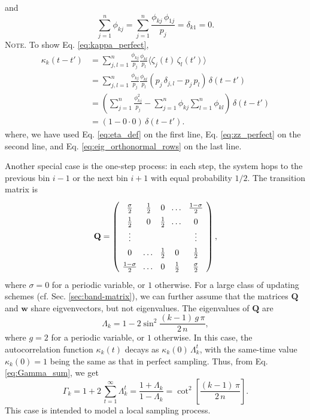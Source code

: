 \documentclass[reprint, floatfix]{revtex4-1}
\newcommand{\note}[1]{{\color{DarkGreen}\footnotesize \textsc{Note.} #1}}
\begin{document}
and
$$
  \sum_{j = 1}^n \phi_{kj}
  =
  \sum_{j = 1}^n \frac{ \phi_{kj} \, \phi_{1j} } { p_j }
  =
  \delta_{k1}
  =
  0.
$$
%
\note{To show Eq. \eqref{eq:kappa_perfect},
  $$
  \begin{aligned}
  \kappa_k(t - t')
  &=
  \sum_{j,l = 1}^n
  \frac{ \phi_{kj} } { p_j }
  \frac{ \phi_{kl} } { p_l }
  \langle \zeta_j(t) \, \zeta_l(t') \rangle
  \\
  &=
  \sum_{j,l = 1}^n
  \frac{ \phi_{kj} } { p_j }
  \frac{ \phi_{kl} } { p_l }
  \left(
    p_j \, \delta_{j, l} - p_j \, p_l
  \right)
  \, \delta(t - t')
  \\
  &=
  \left(
    \sum_{j = 1}^n
    \frac{ \phi_{kj}^2 } { p_j }
    -
    \sum_{j = 1}^n \phi_{kj}
    \sum_{l = 1}^n \phi_{kl}
  \right)
  \, \delta(t - t')
  \\
  &=
  (1 - 0 \cdot 0) \, \delta(t - t').
  \end{aligned}
  $$
  where,
  we have used
  Eq. \eqref{eq:eta_def}
  on the first line,
  Eq. \eqref{eq:zz_perfect}
  on the second line,
  and
  Eq. \eqref{eq:eig_orthonormal_rows}
  on the last line.
}


Another special case is the one-step process\cite{vankampen}:
in each step, the system hops to the previous bin $i - 1$
or the next bin $i + 1$ with equal probability $1/2$.
%
The transition matrix is
%
\begin{equation}
\arraycolsep=3.6pt\def\arraystretch{1.4}
\mathbf Q
=
\left(
  \begin{array}{cccccccc}
    \frac \sigma 2 & \frac 1 2 & 0 & \dots & \frac {1 - \sigma} 2 \\
    \frac 1 2 & 0         & \frac 1 2 & \dots & 0 \\
    \vdots & &  & & \vdots \\
    0 & \dots & \frac 1 2 & 0  & \frac 1 2 \\
    \frac {1 - \sigma} 2 & \dots & 0 & \frac 1 2 & \frac \sigma 2
  \end{array}
\right),
\label{eq:T_nn}
\end{equation}
%
where $\sigma = 0$ for a periodic variable, or $1$ otherwise.
%
For a large class of updating schemes
(cf. Sec. \ref{sec:band-matrix}),
we can further assume that
the matrices $\mathbf Q$ and $\mathbf w$
share eigvenvectors, but not eigenvalues.
%
The eigenvalues of $\mathbf Q$ are
$$
\Lambda_k
=
1 -
2 \sin^2 \frac{ (k - 1) \, g \, \pi }
              {       2 \, n        }
,
$$
where
$g = 2$ for a periodic variable, or $1$ otherwise.
%
In this case,
the autocorrelation function $\kappa_k(t)$
decays as $\kappa_k(0) \, \Lambda_k^t$,
with the same-time value
$\kappa_k(0) = 1$
being the same as
that in perfect sampling.
%
Thus,
from Eq. \eqref{eq:Gamma_sum}, we get
%
\begin{equation}
\Gamma_k
=
1 + 2 \, \sum_{t = 1}^\infty \Lambda_k^t
=
\frac{ 1 + \Lambda_k } { 1 - \Lambda_k }
=
\cot^2 \left[ \frac{ (k - 1) \, \pi } { 2 \, n } \right].
\label{eq:Gamma_onestep}
\end{equation}
%
This case is intended to model a local sampling process.
\end{document}
